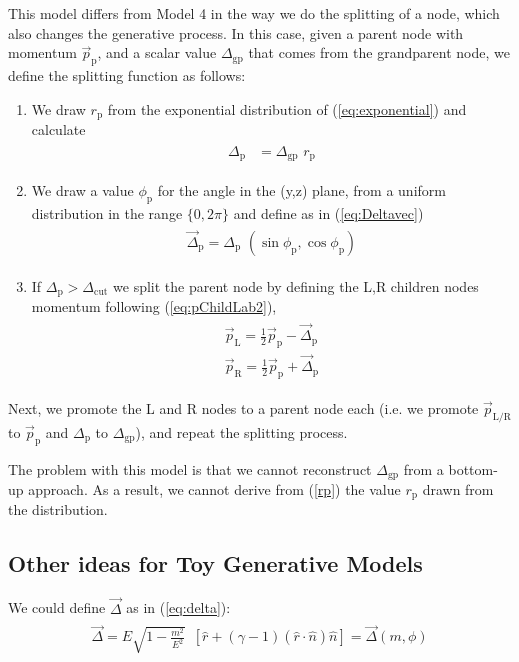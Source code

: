 \documentclass[12pt]{article}
\newcommand{\bea}{\begin{eqnarray}\begin{aligned}}
\newcommand{\eea}{\end{aligned}\end{eqnarray}}
\begin{document}
This model differs from Model 4 in the way we do the splitting of a node, which also changes the generative process. In this case, given a parent node with momentum $\vec{p}_\text{p}$, and a scalar value $\Delta_{\text{gp}}$ that comes from the grandparent node, we define the splitting function as follows:
\begin{enumerate}

\item We draw $r_\text{p}$ from the exponential distribution of (\ref{eq:exponential}) and calculate
\bea\label{rp}
\Delta_\text{p} &= \Delta_\text{gp} \,\, r_\text{p}
\eea

\item We draw a value $\phi_\text{p}$ for the angle in the (y,z) plane, from a uniform distribution in the range $\{0,2\pi\}$ and define as in (\ref{eq:Deltavec})
\bea
\vec{\Delta}_\text{p}= \Delta_\text{p}\,\,(\sin\phi_\text{p},\cos\phi_\text{p})\nonumber
\eea 

\item If $\Delta_\text{p} > \Delta_\text{cut}$ we split the parent node by defining the L,R children nodes momentum following (\ref{eq:pChildLab2}),
\bea
\vec{p}_\text{L}= \frac{1}{2} \vec{p}_\text{p} - \vec{\Delta}_\text{p}  \\
\vec{p}_\text{R}= \frac{1}{2} \vec{p}_\text{p} +\vec{\Delta}_\text{p} \nonumber
\eea

\end{enumerate}

Next, we promote the L and R nodes to a parent node each (i.e. we promote $\vec{p}_\text{L/R}$ to $\vec{p}_\text{p}$ and $\Delta_\text{p}$ to $\Delta_\text{gp}$), and repeat the splitting process.


The problem with this model is that we cannot reconstruct $\Delta_\text{gp}$ from a bottom-up approach. As a result, we cannot derive from (\ref{rp}) the value $r_\text{p}$  drawn from the distribution. 


\subsection{Other ideas for Toy Generative Models}

We could define $\vec{\Delta}$  as in (\ref{eq:delta}):
\bea
 \vec{\Delta}   = E \sqrt{1-\frac{m^2}{E^2}} \,\,\,[ \hat{r} + (\gamma -1) (\hat{r} \cdot \hat{n}) \hat{n} ] = \vec{\Delta}(m,\phi)
\eea
\end{document}
